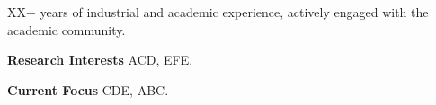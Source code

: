 
XX+ years of industrial and academic experience, actively engaged with the academic community.

\textbf{Research Interests} \qquad ACD, EFE.

\textbf{Current Focus} \qquad \qquad  	 	CDE, ABC.


